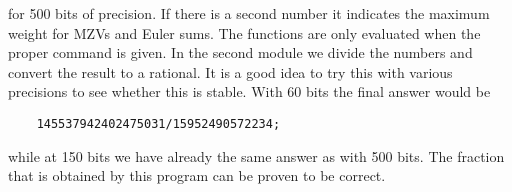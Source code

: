 for 500 bits of precision. If there is a second number it indicates the 
maximum weight for MZVs and Euler sums. The functions are only evaluated 
when the proper command is given. In the second module we divide the 
numbers and convert the result to a rational. It is a good idea to try this 
with various precisions to see whether this is stable. With 60 bits the 
final answer would be
\begin{verbatim}
    145537942402475031/15952490572234;
\end{verbatim}
while at 150 bits we have already the same answer as with 500 bits. The 
fraction that is obtained by this program can be proven to be correct.
\vspace{3mm}

